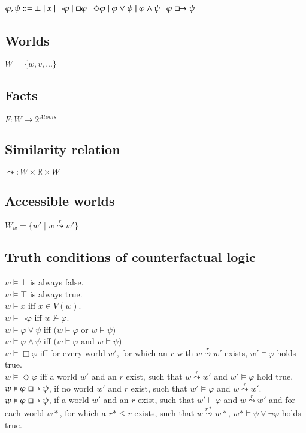 \documentclass[a4paper,american]{paper}
\begin{document}
$\varphi, \psi ::= \bot \mid x \mid \neg \varphi \mid \Box \varphi \mid \Diamond \varphi \mid \varphi \vee \psi \mid \varphi \wedge \psi \mid \varphi \boxright \psi$

\subsection{Worlds}
$W = \{w,v,...\}$

\subsection{Facts}
$F \colon W \rightarrow 2^{Atoms}$

\subsection{Similarity relation}
$\leadsto \colon W\times \mathbb{R} \times W$

\subsection{Accessible worlds}
$W_w = \{w'\mid w \overset{r}{\leadsto} w'\}$

\subsection{Truth conditions of counterfactual logic}
$w \vDash \bot$ is always false. \\
$w \vDash \top$ is always true. \\
$w \vDash x$ iff $x \in V(w)$. \\
$w \vDash \neg \varphi$ iff $w \nvDash \varphi$. \\
$w \vDash \varphi \vee \psi$ iff $(w \vDash \varphi$ or $w \vDash \psi)$ \\
$w \vDash \varphi \wedge \psi$ iff $(w \vDash \varphi$ and $w \vDash \psi)$ \\
$w \vDash \Box \varphi$ iff for every world $w'$, for which an $r$ with $w\overset{r}{\leadsto} w'$ exists, $w' \vDash \varphi$ holds true. \\
$w \vDash \Diamond \varphi$ iff a world $w'$ and an $r$ exist, such that $w\overset{r}{\leadsto} w'$ and $w' \vDash \varphi$ hold true. \\
$w \vDash \varphi \boxright \psi$, if no world $w'$ and $r$ exist, such that $w' \vDash \varphi$ and $w\overset{r}{\leadsto} w'$. \\
$w \vDash \varphi \boxright \psi$, if a world $w'$ and an $r$ exist, such that $w'\vDash \varphi$ and $w\overset{r}{\leadsto} w'$ and for each world $w*$, for which a $r*\leq r$ exists, such that $w\overset{r*}{\leadsto} w*$, $w*\vDash\psi\vee\neg\varphi$ holds true.
\end{document}
